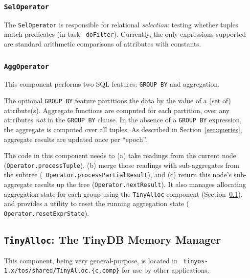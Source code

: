 \documentclass[11pt]{article}
\newcommand{\docroot}{tinyos-1.x}
\begin{document}
\subsubsection {\tt SelOperator}
The {\tt SelOperator} is responsible for relational {\em
selection}: testing whether tuples match predicates (in task {\tt
doFilter}). Currently, the only expressions supported are standard
arithmetic comparisons of attributes with constants.

\subsubsection {\tt AggOperator}
This component performs two SQL features: {\tt GROUP BY} and
aggregation.

The optional {\tt GROUP BY} feature partitions the data by the value
of a (set of) attribute(s).  Aggregate functions are computed for each
partition, over any attributes {\em not} in the {\tt GROUP BY} clause.  In
the absence of a {\tt GROUP BY} expression, the aggregate is computed
over all tuples.  As described in Section~\ref{sec:queries}, aggregate
results are updated once per ``epoch''.

The code in this component needs to (a) take readings from the current
node ({\tt Operator.processTuple}), (b) merge those readings
with sub-aggregates from the subtree ({\tt
Operator.processPartialResult}), and (c) return this node's
sub-aggregate results up the tree ({\tt Operator.nextResult}).
It also manages allocating aggregation state for each group using the
{\tt TinyAlloc} component (Section~\ref{sec:tinyalloc}), and
provides a utility to reset the running aggregation state ({\tt
Operator.resetExprState}).

\subsection {{\tt TinyAlloc}: The TinyDB Memory Manager}
\label{sec:tinyalloc}
This component, being very general-purpose, is located in {\tt
\docroot/tos/shared/TinyAlloc.\{c,comp\}} for use by other applications.
\end{document}
